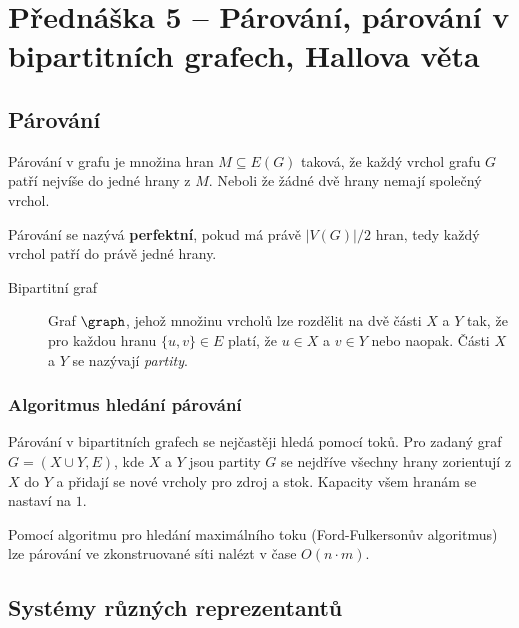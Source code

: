 \section{Přednáška 5 -- Párování, párování v bipartitních grafech, Hallova věta}

\subsection{Párování}

Párování v grafu je množina hran \(M \subseteq E(G)\) taková, že každý vrchol grafu $G$ patří nejvíše do jedné hrany z $M$.
Neboli že žádné dvě hrany nemají společný vrchol.

Párování se nazývá \textbf{perfektní}, pokud má právě \(|V(G)| / 2 \) hran, tedy každý vrchol patří do právě jedné hrany.

\begin{description}
    \item[Bipartitní graf] Graf $\graph$, jehož množinu vrcholů lze rozdělit na dvě části $X$ a $Y$ tak, že pro každou hranu $\{u,v\} \in E$ platí, že $u \in X$ a $v \in Y$ nebo naopak.
    Části $X$ a $Y$ se nazývají \textit{partity}.
\end{description}

\subsubsection{Algoritmus hledání párování}\label{alg:parovani-v-bip-grafech}

Párování v bipartitních grafech se nejčastěji hledá pomocí toků.
Pro zadaný graf\newline $G=(X \cup Y,E)$, kde $X$ a $Y$ jsou partity $G$ se nejdříve všechny hrany zorientují z $X$ do $Y$ a přidají se nové vrcholy pro zdroj a stok.
Kapacity všem hranám se nastaví na $1$.



Pomocí algoritmu pro hledání maximálního toku (Ford-Fulkersonův algoritmus) lze párování ve zkonstruované síti nalézt v čase \(O(n\cdot{}m)\).

\subsection{Systémy různých reprezentantů}\label{alg:srr-v-bip-grafech}

